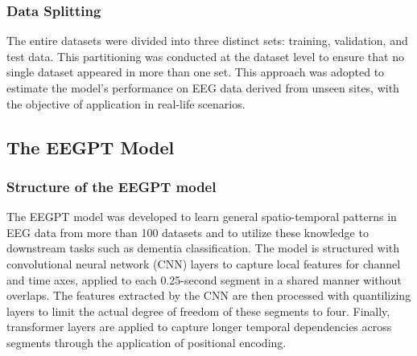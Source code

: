 \subsubsection{Data Splitting}
The entire datasets were divided into three distinct sets: training, validation, and test data. This partitioning was conducted at the dataset level to ensure that no single dataset appeared in more than one set. This approach was adopted to estimate the model's performance on EEG data derived from unseen sites, with the objective of application in real-life scenarios.

\subsection{The EEGPT Model}
\subsubsection{Structure of the EEGPT model}
The EEGPT model was developed to learn general spatio-temporal patterns in EEG data from more than 100 datasets and to utilize these knowledge to downstream tasks such as dementia classification. The model is structured with convolutional neural network (CNN) layers to capture local features for channel and time axes, applied to each 0.25-second segment in a shared manner without overlaps. The features extracted by the CNN are then processed with quantilizing layers to limit the actual degree of freedom of these segments to four. Finally, transformer layers are applied to capture longer temporal dependencies across segments through the application of positional encoding.



